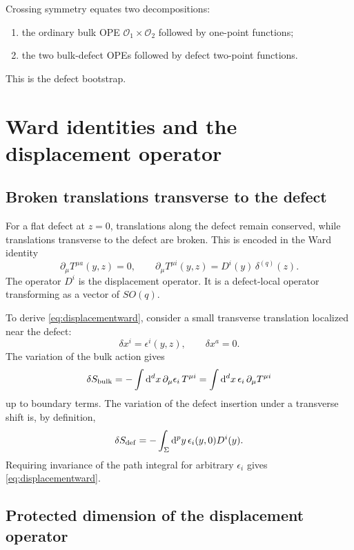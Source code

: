 \documentclass[11pt]{article}
\newcommand{\dd}{\mathrm{d}}
\newcommand{\cO}{\mathcal{O}}
\begin{document}
Crossing symmetry equates two decompositions:
\begin{enumerate}
  \item the ordinary bulk OPE $\cO_1\times\cO_2$ followed by one-point functions;
  \item the two bulk-defect OPEs followed by defect two-point functions.
\end{enumerate}
This is the defect bootstrap.

\section{Ward identities and the displacement operator}

\subsection{Broken translations transverse to the defect}

For a flat defect at $z=0$, translations along the defect remain conserved, while translations transverse to the defect are broken.  This is encoded in the Ward identity
\begin{equation}
  \partial_\mu T^{\mu a}(y,z)=0,
  \qquad
  \partial_\mu T^{\mu i}(y,z)=D^i(y)\,\delta^{(q)}(z) .
  \label{eq:displacementward}
\end{equation}
The operator $D^i$ is the displacement operator.  It is a defect-local operator transforming as a vector of $SO(q)$.

To derive \eqref{eq:displacementward}, consider a small transverse translation localized near the defect:
\begin{equation}
  \delta x^i=\epsilon^i(y,z),\qquad \delta x^a=0 .
\end{equation}
The variation of the bulk action gives
\begin{equation}
  \delta S_{\rm bulk}=-\int \dd^d x\,\partial_\mu \epsilon_i\,T^{\mu i}
  =\int \dd^d x\,\epsilon_i\,\partial_\mu T^{\mu i}
\end{equation}
up to boundary terms.  The variation of the defect insertion under a transverse shift is, by definition,
\begin{equation}
  \delta S_{\rm def}=-\int_{\Sigma}\dd^p y\,\epsilon_i(y,0)D^i(y) .
\end{equation}
Requiring invariance of the path integral for arbitrary $\epsilon_i$ gives \eqref{eq:displacementward}.

\subsection{Protected dimension of the displacement operator}
\end{document}
